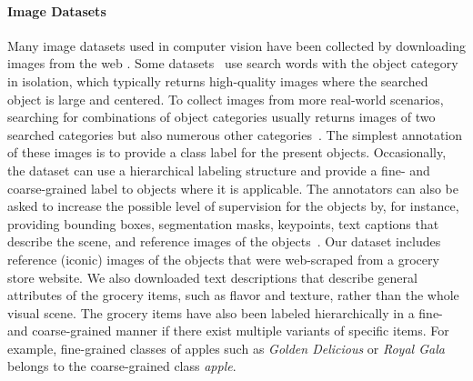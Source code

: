 \paragraph{Image Datasets} Many image datasets used in computer vision have been collected by downloading images from the web . 
Some datasets~ use search words with the object category in isolation, which typically returns high-quality images where the searched object is large and centered. To collect images from more real-world scenarios, searching for combinations of object categories usually returns images of two searched categories but also numerous other categories~. 
The simplest annotation of these images is to provide a class label for the present objects. Occasionally, the dataset can use a hierarchical labeling structure and provide a fine- and coarse-grained label to objects where it is applicable. 
The annotators can also be asked to increase the possible level of supervision for the objects by, for instance, providing bounding boxes, segmentation masks, keypoints, text captions that describe the scene, and reference images of the objects~. Our dataset includes reference (iconic) images of the objects that were web-scraped from a grocery store website. We also downloaded text descriptions that describe general attributes of the grocery items, such as flavor and texture, rather than the whole visual scene. The grocery items have also been labeled hierarchically in a fine- and coarse-grained manner if there exist multiple variants of specific items. For example, fine-grained classes of apples such as \textit{Golden Delicious} or \textit{Royal Gala} belongs to the coarse-grained class \textit{apple}.

